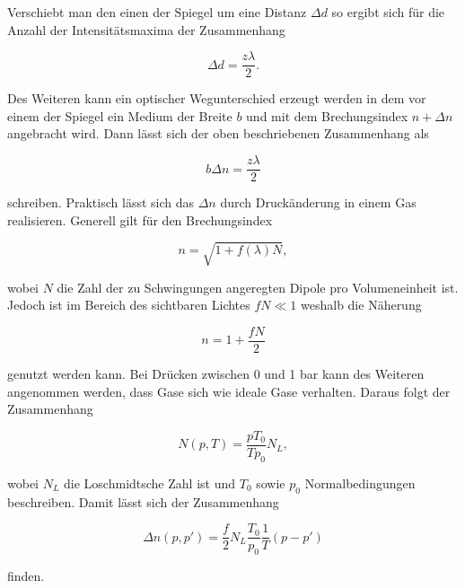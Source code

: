 Verschiebt man den einen der Spiegel um eine Distanz $\Delta d$ so ergibt sich für die Anzahl der Intensitätsmaxima der Zusammenhang

\begin{equation}
    \label{eqn:verschieben}
    \Delta d = \frac{z \lambda}{2}.
\end{equation}

Des Weiteren kann ein optischer Wegunterschied erzeugt werden in dem vor einem der Spiegel ein Medium der Breite $b$ und mit dem Brechungsindex $n + \Delta n$ angebracht wird.
Dann lässt sich der oben beschriebenen Zusammenhang als

\begin{equation}
    \label{eqn:brech}
    b \Delta n = \frac{z \lambda}{2}
\end{equation}

schreiben.
Praktisch lässt sich das $\Delta n$ durch Druckänderung in einem Gas realisieren. Generell gilt für den Brechungsindex

\begin{equation}
    n = \sqrt{1 + f(\lambda) N},
\end{equation}

wobei $N$ die Zahl der zu Schwingungen angeregten Dipole pro Volumeneinheit ist. Jedoch ist im Bereich des sichtbaren Lichtes $fN \ll 1$ weshalb die Näherung

\begin{equation}
    n = 1 + \frac{fN}{2}
\end{equation}

genutzt werden kann. Bei Drücken zwischen 0 und 1 bar kann des Weiteren angenommen werden, dass Gase sich wie ideale Gase verhalten.
Daraus folgt der Zusammenhang

\begin{equation}
    N(p, T) = \frac{pT_0}{Tp_0}N_L,
\end{equation}

wobei $N_L$ die Loschmidtsche Zahl ist und $T_0$ sowie $p_0$ Normalbedingungen beschreiben.
Damit lässt sich der Zusammenhang

\begin{equation}
    \label{eqn:delta-n}
    \Delta n (p, p') = \frac{f}{2} N_L \frac{T_0}{p_0} \frac{1}{T}(p-p')
\end{equation}

finden.